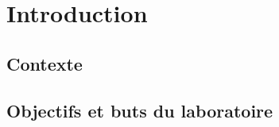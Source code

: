 \documentclass[Deriaz_Traiber_Labo02]{subfiles}
\begin{document}
\section{Introduction}


\subsection{Contexte}


\subsection{Objectifs et buts du laboratoire}
\end{document}
